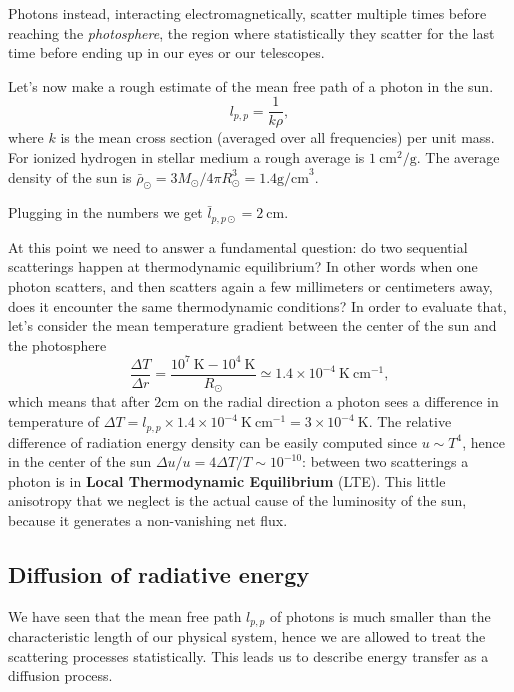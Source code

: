 Photons instead, interacting electromagnetically, scatter multiple times before reaching the \textit{photosphere}, the region where statistically they scatter for the last time before ending up in our eyes or our telescopes. 

Let's now make a rough estimate of the mean free path of a photon in the sun. 
\begin{equation}\label{mfp}
	l_{p,p}=\frac{1}{k \rho},
\end{equation}
where $k$ is the mean cross section (averaged over all frequencies) per unit mass. For ionized hydrogen in stellar medium a rough average is $1 \ \mathrm{cm^2/g}$. The average density of the sun is $\bar\rho_{\odot}=3M_{\odot}/4 \pi R_{\odot}^3= 1.4 \mathrm{g /cm}^3$. 

Plugging in the numbers we get $\bar l_{p,p \odot}=2 \  \mathrm{cm}$. 

At this point we need to answer a fundamental question: do two sequential scatterings happen at thermodynamic equilibrium? In other words when one photon scatters, and then scatters again a few millimeters or centimeters away, does it encounter the same thermodynamic conditions? In order to evaluate that, let's consider the mean temperature gradient between the center of the sun and the photosphere
$$
\frac{\Delta T}{\Delta r} = \frac{10^7 \ \mathrm{K}-10^4  \ \mathrm{K}}{R_{\odot}} \simeq 1.4 \times 10^{-4} \  \mathrm{K} \ \mathrm{cm} ^{-1},
$$
which means that after $2 \mathrm{cm}$ on the radial direction a photon sees a difference in temperature of $\Delta T = l_{p,p} \times 1.4 \times 10^{-4}  \  \mathrm{K} \ \mathrm{cm} ^{-1}= 3 \times 10^{-4} \  \mathrm{K}$. The relative difference of radiation energy density can be easily computed since $u \sim T^4$, hence in the center of the sun $\Delta u/u=4 \Delta T / T \sim 10^{-10}$: between two scatterings a photon is in \textbf{Local Thermodynamic Equilibrium} (LTE). This little anisotropy that we neglect is the actual cause of the luminosity of the sun, because it generates a non-vanishing net flux.
\subsection{Diffusion of radiative energy}
We have seen that the mean free path $l_{p,p}$ of photons is much smaller than the characteristic length of our physical system, hence we are allowed to treat the scattering processes statistically. This leads us to describe energy transfer as a diffusion process. 

